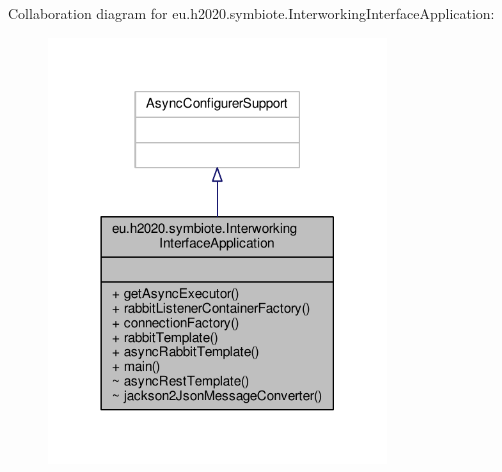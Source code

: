 Collaboration diagram for eu.\+h2020.\+symbiote.\+Interworking\+Interface\+Application\+:
\nopagebreak
\begin{figure}[H]
\begin{center}
\leavevmode
\includegraphics[width=254pt]{classeu_1_1h2020_1_1symbiote_1_1InterworkingInterfaceApplication__coll__graph}
\end{center}
\end{figure}
